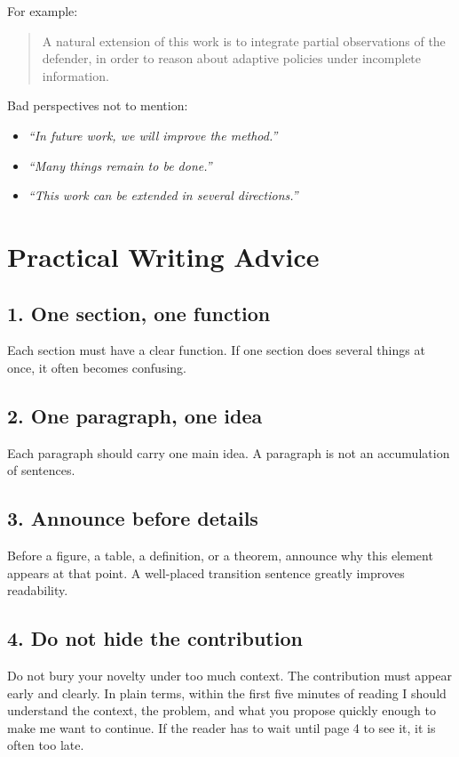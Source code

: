 \documentclass[11pt,a4paper]{article}
\theoremstyle{definition}
\begin{document}
For example:
\begin{quote}
A natural extension of this work is to integrate partial observations of the defender, in order to reason about adaptive policies under incomplete information.
\end{quote}

Bad perspectives not to mention:
\begin{itemize}
    \item \textit{``In future work, we will improve the method.''}
    \item \textit{``Many things remain to be done.''}
    \item \textit{``This work can be extended in several directions.''}
\end{itemize}

\section{Practical Writing Advice}

\subsection*{1. One section, one function}

Each section must have a clear function. If one section does several things at once, it often becomes confusing.

\subsection*{2. One paragraph, one idea}

Each paragraph should carry one main idea. A paragraph is not an accumulation of sentences.

\subsection*{3. Announce before details}

Before a figure, a table, a definition, or a theorem, announce why this element appears at that point. A well-placed transition sentence greatly improves readability.

\subsection*{4. Do not hide the contribution}

Do not bury your novelty under too much context. The contribution must appear early and clearly. In plain terms, within the first five minutes of reading I should understand the context, the problem, and what you propose quickly enough to make me want to continue. If the reader has to wait until page 4 to see it, it is often too late.
\end{document}
